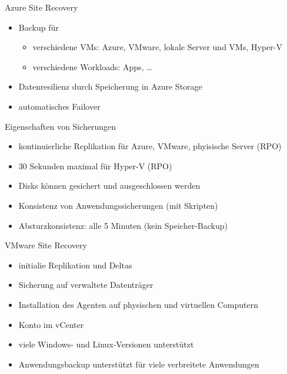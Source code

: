 \begin{flashcard}[Definition]{Azure Site Recovery}
  \begin{itemize}
    \item Backup für
      \begin{itemize}
        \item verschiedene VMs: Azure, VMware, lokale Server und VMs, Hyper-V
        \item verschiedene Workloads: Apps, \ldots
      \end{itemize}
    \item Datenresilienz durch Speicherung in Azure Storage
    \item automatisches Failover
  \end{itemize}
\end{flashcard}

\begin{flashcard}[Definition]{Eigenschaften von Sicherungen}
  \begin{itemize}
    \item kontinuierliche Replikation für Azure, VMware, phyisische Server (RPO)
    \item 30 Sekunden maximal für Hyper-V (RPO)
    \item Disks können gesichert und ausgeschlossen werden
    \item Konsistenz von Anwendungssicherungen (mit Skripten)
    \item Absturzkonsistenz: alle 5 Minuten (kein Speicher-Backup)
  \end{itemize}
\end{flashcard}

\begin{flashcard}[Definition]{VMware Site Recovery}
  \begin{itemize}
    \item initialie Replikation und Deltas
    \item Sicherung auf verwaltete Datenträger
    \item Installation des Agenten auf physischen und virtuellen Computern
    \item Konto im vCenter
    \item viele Windows- und Linux-Versionen unterstützt
    \item Anwendungsbackup unterstützt für viele verbreitete Anwendungen
  \end{itemize}
\end{flashcard}

